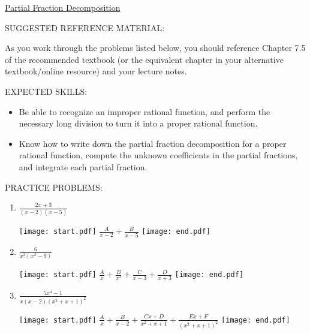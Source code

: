 \documentclass[12pt]{article}
\begin{document}
\begin{center}
\underline{\LARGE{Partial Fraction Decomposition}}
\end{center}

\noindent SUGGESTED REFERENCE MATERIAL:

\bigskip

\noindent As you work through the problems listed below, you should reference Chapter 7.5 of the recommended textbook (or the equivalent chapter in your alternative textbook/online resource) and your lecture notes.

\bigskip

\noindent EXPECTED SKILLS:

\begin{itemize}

\item Be able to recognize an improper rational function, and perform the necessary long division to turn it into a proper rational function. 

\item Know how to write down the partial fraction decomposition for a proper rational function, compute the unknown
coefficients in the partial fractions, and integrate each partial fraction.

\end{itemize}

\noindent PRACTICE PROBLEMS:

\medskip


\begin{enumerate}

\item $\frac{2x+3}{(x-2)(x-5)}$

\texttt{[image: start.pdf]}
{{$\frac{A}{x-2}+\frac{B}{x-5}$}}
\texttt{[image: end.pdf]}


\item $\frac{6}{x^2(x^2-9)}$

\texttt{[image: start.pdf]}
{{$\frac{A}{x}+\frac{B}{x^2}+\frac{C}{x-3}+\frac{D}{x+3}$}}
\texttt{[image: end.pdf]}


\item $\frac{5x^4-1}{x(x-2)(x^2+x+1)^2}$

\texttt{[image: start.pdf]}
{{$\frac{A}{x}+\frac{B}{x-2}+\frac{Cx+D}{x^2+x+1}+\frac{Ex+F}{(x^2+x+1)^2}$}}
\texttt{[image: end.pdf]}


\end{enumerate}
\end{document}
